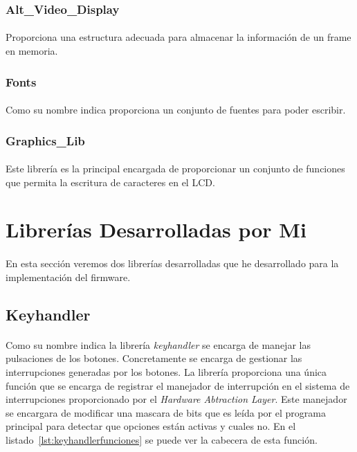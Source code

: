 \documentclass[a4paper,12pt,titlepage,final]{book}
\begin{document}
\subsubsection{Alt\_Video\_Display}
\paragraph{}
Proporciona una estructura adecuada para almacenar la información de un frame en memoria.

\subsubsection{Fonts}
\paragraph{}
Como su nombre indica proporciona un conjunto de fuentes para poder escribir.

\subsubsection{Graphics\_Lib}
\paragraph{}
Este librería es la principal encargada de proporcionar un conjunto de funciones que permita la escritura de caracteres en el LCD.

\section{Librerías Desarrolladas por Mi}
\paragraph{}
En esta sección veremos dos librerías desarrolladas que he desarrollado para la implementación del firmware.

\subsection{Keyhandler}
\paragraph{}
Como su nombre indica la librería \textit{keyhandler} se encarga de manejar las pulsaciones de los botones. Concretamente se encarga de gestionar las interrupciones generadas por los botones. La librería proporciona una única función que se encarga de registrar el manejador de interrupción en el sistema de interrupciones proporcionado por el \textit{Hardware Abtraction Layer}. Este manejador se encargara de modificar una mascara de bits que es leída por el programa principal para detectar que opciones están activas y cuales no. En el listado~\ref{lst:keyhandlerfunciones} se puede ver la cabecera de esta función.
\end{document}
